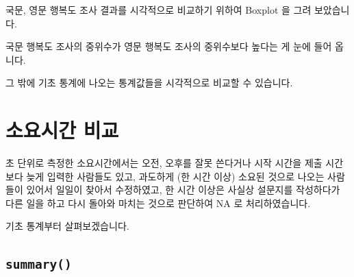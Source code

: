 \documentclass[
]{book}
\begin{document}
국문, 영문 행복도 조사 결과를 시각적으로 비교하기 위하여 Boxplot 을 그려 보았습니다.

국문 행복도 조사의 중위수가 영문 행복도 조사의 중위수보다 높다는 게 눈에 들어 옵니다.

그 밖에 기초 통계에 나오는 통계값들을 시각적으로 비교할 수 있습니다.

\section{소요시간 비교}\label{uxc18cuxc694uxc2dcuxac04-uxbe44uxad50-1}

초 단위로 측정한 소요시간에서는 오전, 오후를 잘못 쓴다거나 시작 시간을 제출 시간보다 늦게 입력한 사람들도 있고, 과도하게 (한 시간 이상) 소요된 것으로 나오는 사람들이 있어서 일일이 찾아서 수정하였고, 한 시간 이상은 사실상 설문지를 작성하다가 다른 일을 하고 다시 돌아와 마치는 것으로 판단하여 NA 로 처리하였습니다.

기초 통계부터 살펴보겠습니다.

\subsection{\texorpdfstring{\texttt{summary()}}{summary()}}\label{summary-4}
\end{document}
